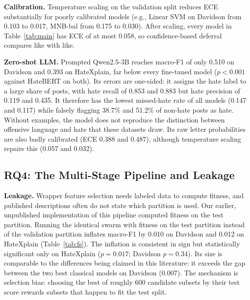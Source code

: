 \documentclass[lettersize,journal]{IEEEtran}
\begin{document}
\textbf{Calibration.} Temperature scaling on the validation split reduces ECE substantially for poorly calibrated models (e.g., Linear SVM on Davidson from 0.103 to 0.017, MNB-bal from 0.175 to 0.030). After scaling, every model in Table~\ref{tab:main} has ECE of at most 0.058, so confidence-based deferral compares like with like.

\textbf{Zero-shot LLM.} Prompted Qwen2.5-3B reaches macro-F1 of only 0.510 on Davidson and 0.393 on HateXplain, far below every fine-tuned model ($p<0.001$ against HateBERT on both). Its errors are one-sided: it assigns the hate label to a large share of posts, with hate recall of 0.853 and 0.883 but hate precision of 0.119 and 0.435. It therefore has the lowest missed-hate rate of all models (0.147 and 0.117) while falsely flagging 38.7\% and 51.2\% of non-hate posts as hate. Without examples, the model does not reproduce the distinction between offensive language and hate that these datasets draw. Its raw letter probabilities are also badly calibrated (ECE 0.388 and 0.487), although temperature scaling repairs this (0.057 and 0.032).

\subsection{RQ4: The Multi-Stage Pipeline and Leakage}\label{sec:leak}
\begin{table}[t]
\centering
\caption{Feature-Selection Audit: Macro-F1 (Mean $\pm$ SD Over Five Splits) Using All Features, a Random Subset of the Size BPSO Chose, BPSO With Validation Fitness, and BPSO With Test-Set Fitness (Leaky)}
\label{tab:fs}
\scriptsize
\setlength{\tabcolsep}{2.5pt}

\end{table}

\textbf{Leakage.} Wrapper feature selection needs labeled data to compute fitness, and published descriptions often do not state which partition is used. Our earlier, unpublished implementation of this pipeline computed fitness on the test partition. Running the identical swarm with fitness on the test partition instead of the validation partition inflates macro-F1 by 0.010 on Davidson and 0.012 on HateXplain (Table~\ref{tab:fs}). The inflation is consistent in sign but statistically significant only on HateXplain ($p=0.017$; Davidson $p=0.34$). Its size is comparable to the differences being claimed in this literature: it exceeds the gap between the two best classical models on Davidson (0.007). The mechanism is selection bias: choosing the best of roughly 600 candidate subsets by their test score rewards subsets that happen to fit the test split.
\end{document}
